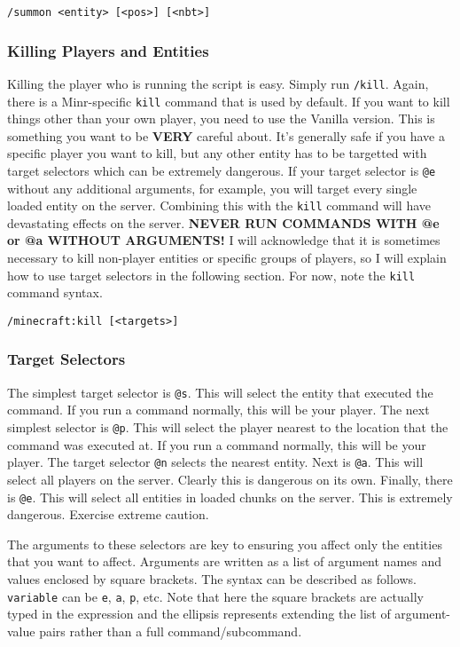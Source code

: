 \documentclass[oneside]{book}
\begin{document}
\begin{verbatim}
/summon <entity> [<pos>] [<nbt>]
\end{verbatim}

\subsubsection*{Killing Players and Entities}
Killing the player who is running the script is easy. Simply run \texttt{/kill}. Again, there is a Minr-specific \texttt{kill} command that is used by default. If you want to kill things other than your own player, you need to use the Vanilla version. This is something you want to be \textbf{VERY} careful about. It's generally safe if you have a specific player you want to kill, but any other entity has to be targetted with target selectors which can be extremely dangerous. If your target selector is \texttt{@e} without any additional arguments, for example, you will target every single loaded entity on the server. Combining this with the \texttt{kill} command will have devastating effects on the server. \textbf{NEVER RUN COMMANDS WITH @e or @a WITHOUT ARGUMENTS!} I will acknowledge that it is sometimes necessary to kill non-player entities or specific groups of players, so I will explain how to use target selectors in the following section. For now, note the \texttt{kill} command syntax.

\begin{verbatim}
/minecraft:kill [<targets>]
\end{verbatim}

\subsubsection*{Target Selectors} \label{subsec:target-selectors}

The simplest target selector is \texttt{@s}. This will select the entity that executed the command. If you run a command normally, this will be your player. The next simplest selector is \texttt{@p}. This will select the player nearest to the location that the command was executed at. If you run a command normally, this will be your player. The target selector \texttt{@n} selects the nearest entity. Next is \texttt{@a}. This will select all players on the server. Clearly this is dangerous on its own. Finally, there is \texttt{@e}. This will select all entities in loaded chunks on the server. This is extremely dangerous. Exercise extreme caution.

The arguments to these selectors are key to ensuring you affect only the entities that you want to affect. Arguments are written as a list of argument names and values enclosed by square brackets. The syntax can be described as follows. \texttt{variable} can be \texttt{e}, \texttt{a}, \texttt{p}, etc. Note that here the square brackets are actually typed in the expression and the ellipsis represents extending the list of argument-value pairs rather than a full command/subcommand.
\end{document}

